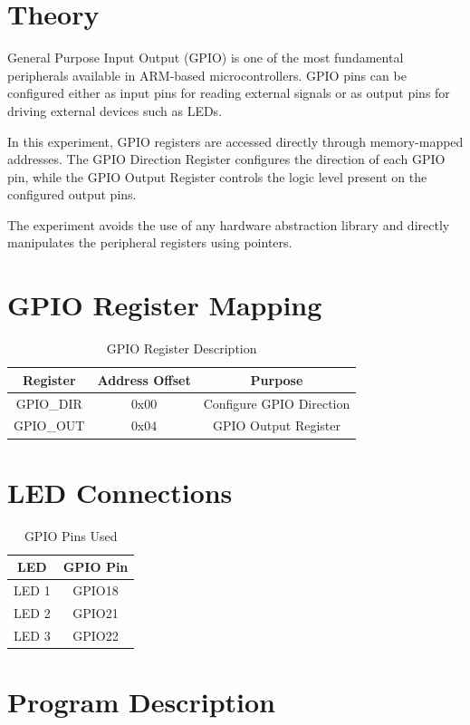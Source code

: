 \documentclass[12pt]{article}
\begin{document}
\section{Theory}

General Purpose Input Output (GPIO) is one of the most fundamental peripherals available in ARM-based microcontrollers. GPIO pins can be configured either as input pins for reading external signals or as output pins for driving external devices such as LEDs.

In this experiment, GPIO registers are accessed directly through memory-mapped addresses. The GPIO Direction Register configures the direction of each GPIO pin, while the GPIO Output Register controls the logic level present on the configured output pins.

The experiment avoids the use of any hardware abstraction library and directly manipulates the peripheral registers using pointers.

\section{GPIO Register Mapping}

\begin{table}[h]
\centering
\begin{tabular}{ccc}
\toprule
Register & Address Offset & Purpose\\
\midrule
GPIO\_DIR & 0x00 & Configure GPIO Direction\\
GPIO\_OUT & 0x04 & GPIO Output Register\\
\bottomrule
\end{tabular}
\caption{GPIO Register Description}
\end{table}

\section{LED Connections}

\begin{table}[h]
\centering
\begin{tabular}{cc}
\toprule
LED & GPIO Pin\\
\midrule
LED 1 & GPIO18\\
LED 2 & GPIO21\\
LED 3 & GPIO22\\
\bottomrule
\end{tabular}
\caption{GPIO Pins Used}
\end{table}

\section{Program Description}
\end{document}
